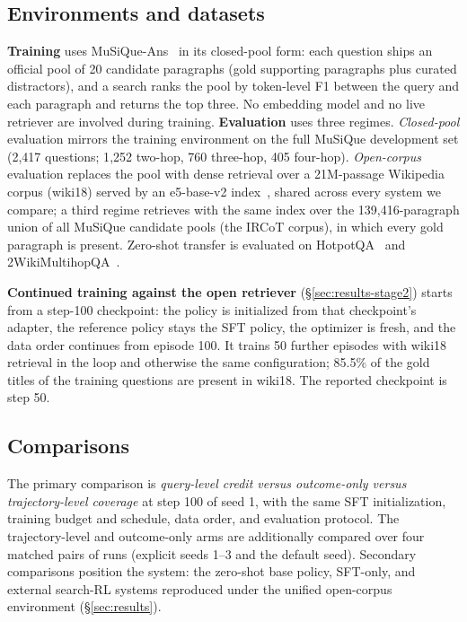 \subsection{Environments and datasets}
\label{sec:setup-data}

\textbf{Training} uses MuSiQue-Ans~\citep{trived2022musique} in its
closed-pool form: each question ships an official pool of 20 candidate
paragraphs (gold supporting paragraphs plus curated distractors), and
a search ranks the pool by token-level F1 between the query and each
paragraph and returns the top three. No embedding model and no live
retriever are involved during training. \textbf{Evaluation} uses three
regimes. \emph{Closed-pool} evaluation mirrors the training environment
on the full MuSiQue development set (2{,}417 questions; 1{,}252 two-hop,
760 three-hop, 405 four-hop). \emph{Open-corpus} evaluation replaces the
pool with dense retrieval over a 21M-passage Wikipedia corpus
(wiki18) served by an e5-base-v2 index~\citep{wang2024text,Jin2025flashrag},
shared across every system we compare; a third regime retrieves with
the same index over the 139{,}416-paragraph union of all MuSiQue
candidate pools (the IRCoT corpus), in which every gold paragraph is
present. Zero-shot transfer is evaluated on
HotpotQA~\citep{yang2018hotpotqa} and
2WikiMultihopQA~\citep{ho2020constructing}.

\textbf{Continued training against the open retriever}
(\S\ref{sec:results-stage2}) starts from a step-100 checkpoint: the
policy is initialized from that checkpoint's adapter, the reference
policy stays the SFT policy, the optimizer is fresh, and the data order
continues from episode 100. It trains 50 further episodes with wiki18
retrieval in the loop and otherwise the same configuration; 85.5\% of
the gold titles of the training questions are present in wiki18. The
reported checkpoint is step 50.

\subsection{Comparisons}
\label{sec:setup-comparisons}

The primary comparison is \emph{query-level credit versus outcome-only
versus trajectory-level coverage} at step 100 of seed 1, with the same
SFT initialization, training budget and schedule, data order, and
evaluation protocol. The trajectory-level and outcome-only arms are
additionally compared over four matched pairs of runs (explicit seeds
1--3 and the default seed). Secondary comparisons position the system:
the zero-shot base policy, SFT-only, and external search-RL systems
reproduced under the unified open-corpus environment
(\S\ref{sec:results}).

